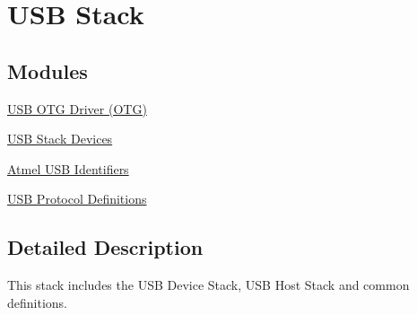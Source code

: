 \hypertarget{group__usb__group}{
\section{\-U\-S\-B \-Stack}
\label{group__usb__group}
}
\subsection*{\-Modules}
\begin{DoxyCompactItemize}
\item 
\hyperlink{group__otg__group}{\-U\-S\-B O\-T\-G Driver (\-O\-T\-G)}
\item 
\hyperlink{group__usb__device__group}{\-U\-S\-B Stack Devices}
\item 
\hyperlink{group__usb__atmel__ids__group}{\-Atmel U\-S\-B Identifiers}
\item 
\hyperlink{group__usb__protocol__group}{\-U\-S\-B Protocol Definitions}
\end{DoxyCompactItemize}


\subsection{\-Detailed \-Description}
\-This stack includes the \-U\-S\-B \-Device \-Stack, \-U\-S\-B \-Host \-Stack and common definitions. 